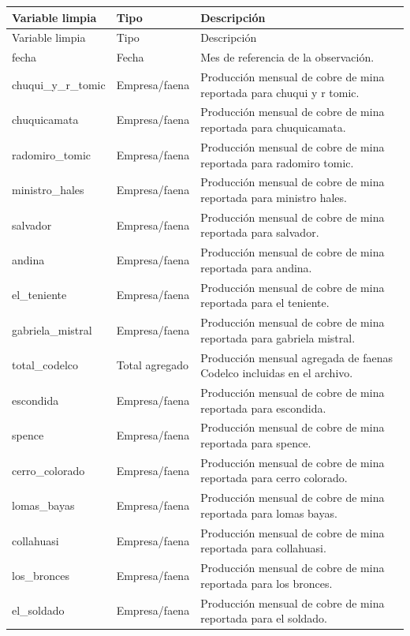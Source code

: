 \begin{longtable}{p{}p{}p{}}
\toprule
Variable limpia & Tipo & Descripción \\
\midrule
\endfirsthead
\toprule
Variable limpia & Tipo & Descripción \\
\midrule
\endhead
fecha & Fecha & Mes de referencia de la observación. \\
chuqui\_y\_r\_tomic & Empresa/faena & Producción mensual de cobre de mina reportada para chuqui y r tomic. \\
chuquicamata & Empresa/faena & Producción mensual de cobre de mina reportada para chuquicamata. \\
radomiro\_tomic & Empresa/faena & Producción mensual de cobre de mina reportada para radomiro tomic. \\
ministro\_hales & Empresa/faena & Producción mensual de cobre de mina reportada para ministro hales. \\
salvador & Empresa/faena & Producción mensual de cobre de mina reportada para salvador. \\
andina & Empresa/faena & Producción mensual de cobre de mina reportada para andina. \\
el\_teniente & Empresa/faena & Producción mensual de cobre de mina reportada para el teniente. \\
gabriela\_mistral & Empresa/faena & Producción mensual de cobre de mina reportada para gabriela mistral. \\
total\_codelco & Total agregado & Producción mensual agregada de faenas Codelco incluidas en el archivo. \\
escondida & Empresa/faena & Producción mensual de cobre de mina reportada para escondida. \\
spence & Empresa/faena & Producción mensual de cobre de mina reportada para spence. \\
cerro\_colorado & Empresa/faena & Producción mensual de cobre de mina reportada para cerro colorado. \\
lomas\_bayas & Empresa/faena & Producción mensual de cobre de mina reportada para lomas bayas. \\
collahuasi & Empresa/faena & Producción mensual de cobre de mina reportada para collahuasi. \\
los\_bronces & Empresa/faena & Producción mensual de cobre de mina reportada para los bronces. \\
el\_soldado & Empresa/faena & Producción mensual de cobre de mina reportada para el soldado. \\

\end{longtable}
